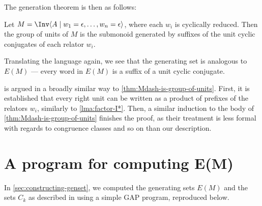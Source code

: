 \documentclass[noindex,noinsetproof,12pt]{lmaths}
\begin{document}
The generation theorem is then as follows:

\begin{theorem} \label{thm:inv-monoid-units-unit-conjugates}
	Let $M = \Inv \langle A \mid w_1 = \epsilon, \ldots, w_n = \epsilon\rangle$, where each $w_i$ is cyclically reduced. Then the group of units of $M$ is the submonoid generated by suffixes of the unit cyclic conjugates of each relator $w_i$.
\end{theorem}

Translating the language again, we see that the generating set is analogous to $E(M)$ --- every word in $E(M)$ is a suffix of a unit cyclic conjugate.

 is argued in a broadly similar way to \cref{thm:Mdash-is-group-of-units}. First, it is established that every right unit can be written as a product of prefixes of the relators $w_i$, similarly to \cref{lma:factor-I*}. Then, a similar induction to the body of \cref{thm:Mdash-is-group-of-units} finishes the proof, as their treatment is less formal with regards to congruence classes and so on than our description.


\appendix
\section{A program for computing \texorpdfstring{E(M)}{$E(M)$}} \label{sec:E(M)-program}

In \cref{sec:constructing-genset}, we computed the generating sets $E(M)$ and the sets $C_k$ as described in \cite{Zhang1992a} using a simple GAP program, reproduced below.

\inputminted[linenos=true,mathescape,tabsize=2,breaklines]{gap}{../ors.g}

\printbibliography

\printindex

\printincompleteproofs
\end{document}

